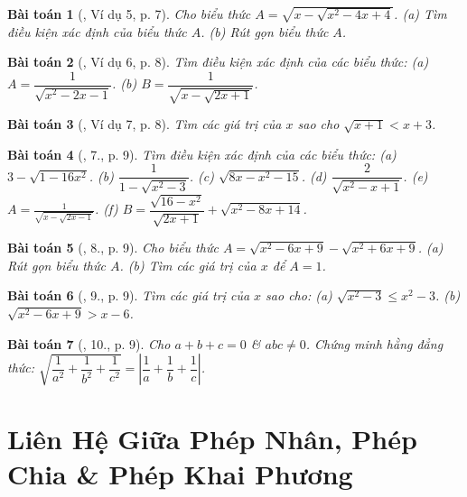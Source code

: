 \documentclass{article}
\newtheorem{baitoan}{Bài toán}
\begin{document}
\begin{baitoan}[\cite{Binh_Toan_9_tap_1}, Ví dụ 5, p. 7]
	Cho biểu thức $A = \sqrt{x - \sqrt{x^2 - 4x + 4}}$. (a) Tìm điều kiện xác định của biểu thức $A$. (b) Rút gọn biểu thức $A$.
\end{baitoan}

\begin{baitoan}[\cite{Binh_Toan_9_tap_1}, Ví dụ 6, p. 8]
	Tìm điều kiện xác định của các biểu thức: (a) $A = \dfrac{1}{\sqrt{x^2 - 2x - 1}}$. (b) $B = \dfrac{1}{\sqrt{x - \sqrt{2x + 1}}}$.
\end{baitoan}

\begin{baitoan}[\cite{Binh_Toan_9_tap_1}, Ví dụ 7, p. 8]
	Tìm các giá trị của $x$ sao cho $\sqrt{x + 1} < x + 3$.
\end{baitoan}

\begin{baitoan}[\cite{Binh_Toan_9_tap_1}, 7., p. 9]
	Tìm điều kiện xác định của các biểu thức: (a) $3 - \sqrt{1 - 16x^2}$. (b) $\dfrac{1}{1 - \sqrt{x^2 - 3}}$. (c) $\sqrt{8x - x^2 - 15}$. (d) $\dfrac{2}{\sqrt{x^2 - x + 1}}$. (e) $A = \frac{1}{\sqrt{x - \sqrt{2x - 1}}}$. (f) $B = \dfrac{\sqrt{16 - x^2}}{\sqrt{2x + 1}} + \sqrt{x^2 - 8x + 14}$.
\end{baitoan}

\begin{baitoan}[\cite{Binh_Toan_9_tap_1}, 8., p. 9]
	Cho biểu thức $A = \sqrt{x^2 - 6x + 9} - \sqrt{x^2 + 6x + 9}$. (a) Rút gọn biểu thức $A$. (b) Tìm các giá trị của $x$ để $A = 1$.
\end{baitoan}

\begin{baitoan}[\cite{Binh_Toan_9_tap_1}, 9., p. 9]
	Tìm các giá trị của $x$ sao cho: (a) $\sqrt{x^2 - 3}\le x^2 - 3$. (b) $\sqrt{x^2 - 6x + 9} > x - 6$.
\end{baitoan}

\begin{baitoan}[\cite{Binh_Toan_9_tap_1}, 10., p. 9]
	Cho $a + b + c = 0$ \& $abc\ne0$. Chứng minh hằng đẳng thức: $\sqrt{\dfrac{1}{a^2} + \dfrac{1}{b^2} + \dfrac{1}{c^2}} = \left|\dfrac{1}{a} + \dfrac{1}{b} + \dfrac{1}{c}\right|$.
\end{baitoan}


\section{Liên Hệ Giữa Phép Nhân, Phép Chia \& Phép Khai Phương}
\end{document}
